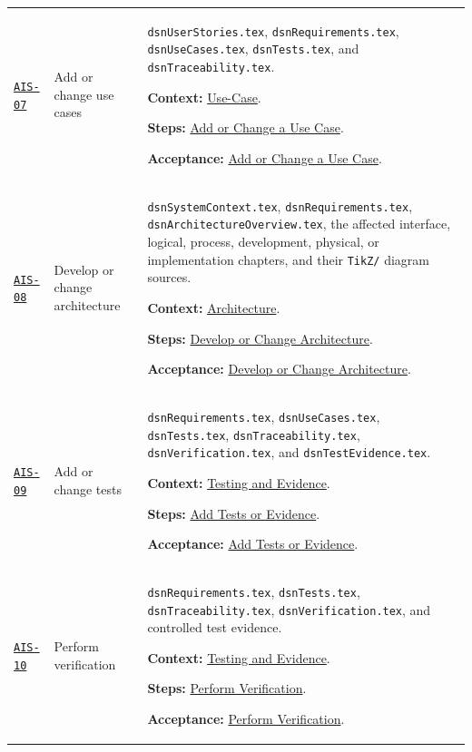 \begin{tabularx}{\linewidth}{L{1.6cm}L{3.1cm}Y}
\label{Skill:AIS-07}\hyperref[Section:AIUseCaseSteps]{\texttt{AIS-07}} & Add or change use cases & \texttt{dsnUserStories.tex}, \texttt{dsnRequirements.tex}, \texttt{dsnUseCases.tex}, \texttt{dsnTests.tex}, and \texttt{dsnTraceability.tex}.\par\textbf{Context:} \hyperref[Section:AIUseCaseContext]{Use-Case}.\par\textbf{Steps:} \hyperref[Section:AIUseCaseTaskSteps]{Add or Change a Use Case}.\par\textbf{Acceptance:} \hyperref[Section:AIUseCaseAcceptance]{Add or Change a Use Case}.\\
\label{Skill:AIS-08}\hyperref[Section:AIArchitectureSteps]{\texttt{AIS-08}} & Develop or change architecture & \texttt{dsnSystemContext.tex}, \texttt{dsnRequirements.tex}, \texttt{dsnArchitectureOverview.tex}, the affected interface, logical, process, development, physical, or implementation chapters, and their \texttt{TikZ/} diagram sources.\par\textbf{Context:} \hyperref[Section:AIArchitectureContext]{Architecture}.\par\textbf{Steps:} \hyperref[Section:AIArchitectureTaskSteps]{Develop or Change Architecture}.\par\textbf{Acceptance:} \hyperref[Section:AIArchitectureAcceptance]{Develop or Change Architecture}.\\
\label{Skill:AIS-09}\hyperref[Section:AITestSteps]{\texttt{AIS-09}} & Add or change tests & \texttt{dsnRequirements.tex}, \texttt{dsnUseCases.tex}, \texttt{dsnTests.tex}, \texttt{dsnTraceability.tex}, \texttt{dsnVerification.tex}, and \texttt{dsnTestEvidence.tex}.\par\textbf{Context:} \hyperref[Section:AITestingContext]{Testing and Evidence}.\par\textbf{Steps:} \hyperref[Section:AITestTaskSteps]{Add Tests or Evidence}.\par\textbf{Acceptance:} \hyperref[Section:AITestAcceptance]{Add Tests or Evidence}.\\
\label{Skill:AIS-10}\hyperref[Section:AIVerificationSteps]{\texttt{AIS-10}} & Perform verification & \texttt{dsnRequirements.tex}, \texttt{dsnTests.tex}, \texttt{dsnTraceability.tex}, \texttt{dsnVerification.tex}, and controlled test evidence.\par\textbf{Context:} \hyperref[Section:AITestingContext]{Testing and Evidence}.\par\textbf{Steps:} \hyperref[Section:AIVerificationTaskSteps]{Perform Verification}.\par\textbf{Acceptance:} \hyperref[Section:AIVerificationAcceptance]{Perform Verification}.\\

\end{tabularx}
